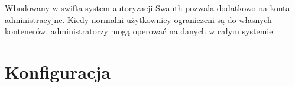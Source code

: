 Wbudowany w swifta system autoryzacji Swauth pozwala dodatkowo na konta administracyjne. Kiedy normalni użytkownicy ograniczeni są do własnych kontenerów, administratorzy mogą operować na danych w całym systemie.

\section{Konfiguracja}\label{sec:konfiguracja}



	

